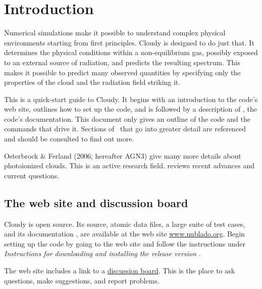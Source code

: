 \documentclass[12pt,twoside]{article}
\begin{document}
\clearpage

\section{Introduction}
\label{sec:Introduction}

Numerical simulations make it
possible to understand complex physical
environments starting from first principles.  Cloudy is designed to do just
that.  It determines the physical conditions within a non-equilibrium gas,
possibly exposed to an external source of radiation, and predicts the
resulting spectrum.  This makes it possible to predict many observed
quantities by specifying only the properties of the cloud and the radiation
field striking it.

This is a quick-start guide to Cloudy.  It begins with an introduction
to the code's web site, outlines how to set up the code, and is followed
by a description of \Hazy, the code's documentation.  This document only
gives an outline of the code and the commands that drive it.  Sections of
\Hazy\ that go into greater detail are referenced and should be consulted
to find out more.

Osterbrock \& Ferland (2006; hereafter AGN3) give many more details
about photoionized clouds.
This is an active research field.
\citet{Ferland03} reviews recent advances and
current questions.

\subsection{The web site and discussion board}

Cloudy is open source.  Its source, atomic data files, a large suite
of test cases, and its documentation \Hazy, are available at the web site
\href{http://www.nublado.org}{www.nublado.org}.
Begin setting up the code by going to the
web site and
follow the instructions under
\emph{Instructions for downloading and installing the release version }.

The web site includes a link to a 
\href{https:cloudyastrophysics.groups.io}{discussion board}.  This is the place
to ask questions, make suggestions, and report problems.
\end{document}
